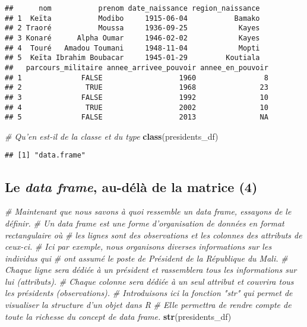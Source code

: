 \documentclass[]{book}
\newenvironment{Shaded}{\begin{snugshade}}{\end{snugshade}}
\newcommand{\KeywordTok}[1]{\textcolor[rgb]{0.13,0.29,0.53}{\textbf{#1}}}
\newcommand{\CommentTok}[1]{\textcolor[rgb]{0.56,0.35,0.01}{\textit{#1}}}
\newcommand{\NormalTok}[1]{#1}
\begin{document}
\begin{verbatim}
##      nom           prenom date_naissance region_naissance
## 1  Keïta           Modibo     1915-06-04           Bamako
## 2 Traoré           Moussa     1936-09-25            Kayes
## 3 Konaré      Alpha Oumar     1946-02-02            Kayes
## 4  Touré   Amadou Toumani     1948-11-04            Mopti
## 5  Keïta Ibrahim Boubacar     1945-01-29         Koutiala
##   parcours_militaire annee_arrivee_pouvoir annee_en_pouvoir
## 1              FALSE                  1960                8
## 2               TRUE                  1968               23
## 3              FALSE                  1992               10
## 4               TRUE                  2002               10
## 5              FALSE                  2013               NA
\end{verbatim}

\begin{Shaded}
\begin{Highlighting}[]
\CommentTok{# Qu'en est-il de la classe et du type}
\KeywordTok{class}\NormalTok{(presidents_df)}
\end{Highlighting}
\end{Shaded}

\begin{verbatim}
## [1] "data.frame"
\end{verbatim}

\normalsize

\subsection{\texorpdfstring{Le \emph{data frame}, au-délà de la matrice
(4)}{Le data frame, au-délà de la matrice (4)}}\label{le-data-frame-au-dela-de-la-matrice-4}

\tiny

\begin{Shaded}
\begin{Highlighting}[]
\CommentTok{# Maintenant que nous savons à quoi ressemble un data frame, essayons de le définir.}
\CommentTok{# Un data frame est une forme d'organisation de données en format rectangulaire où}
\CommentTok{# les lignes sont des observations et les colonnes des attributs de ceux-ci.}
\CommentTok{# Ici par exemple, nous organisons diverses informations sur les individus qui}
\CommentTok{# ont assumé le poste de Président de la République du Mali.}
\CommentTok{# Chaque ligne sera dédiée à un président et rassemblera tous les informations sur lui (attributs).}
\CommentTok{# Chaque colonne sera dédiée à un seul attribut et couvrira tous les présidents (observations).}
\CommentTok{# Introduisons ici la fonction "str" qui permet de visualiser la structure d'un objet dans R}
\CommentTok{# Elle permettra de rendre compte de toute la richesse du concept de data frame.}
\KeywordTok{str}\NormalTok{(presidents_df)}
\end{Highlighting}
\end{Shaded}
\end{document}
